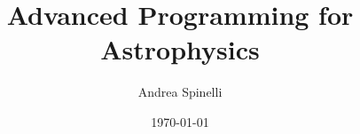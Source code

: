 \documentclass[a4paper,12pt]{report}
\institute{UniTs - University of Trieste}
\title{Advanced Programming for Astrophysics}
\author{Andrea Spinelli}
\date{\today}
\begin{document}
\maketitle



\toc


\printbibliography
\end{document}
